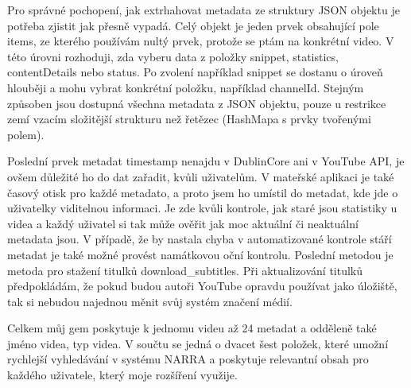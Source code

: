 \par Pro správné pochopení, jak extrhahovat metadata ze struktury JSON objektu je potřeba zjistit jak přesně vypadá. Celý objekt je jeden prvek obsahující pole items, ze kterého používám nultý prvek, protože se ptám na konkrétní video. V této úrovni rozhoduji, zda vyberu data z položky snippet, statistics, contentDetails nebo status. Po zvolení například snippet se dostanu o úroveň hlouběji a mohu vybrat konkrétní položku, například channelId. Stejným způsoben jsou dostupná všechna metadata z JSON objektu, pouze u restrikce zemí vzacím složitější strukturu než řetězec (HashMapa s prvky tvořenými polem).
\par Poslední prvek metadat timestamp nenajdu v DublinCore ani v YouTube API, je ovšem důležité ho do dat zařadit, kvůli uživatelům. V mateřské aplikaci je také časový otisk pro každé metadato, a proto jsem ho umístil do metadat, kde jde o uživatelky viditelnou informaci. Je zde kvůli kontrole, jak staré jsou statistiky u videa a každý uživatel si tak může ověřit jak moc aktuální či neaktuální metadata jsou. V případě, že by nastala chyba v automatizované kontrole stáří metadat je také možné provést namátkovou oční kontrolu. Poslední metodou je metoda pro stažení titulků download\_subtitles. Při aktualizování titulků předpokládám, že pokud budou autoři YouTube opravdu používat jako úložiště, tak si nebudou najednou měnit svůj systém značení médií.
\par Celkem můj gem poskytuje k jednomu videu až 24 metadat a odděleně také jméno videa, typ videa. V součtu se jedná o dvacet šest položek, které umožní rychlejší vyhledávání v systému NARRA a poskytuje relevantní obsah pro každého uživatele, který moje rozšíření využije.






























